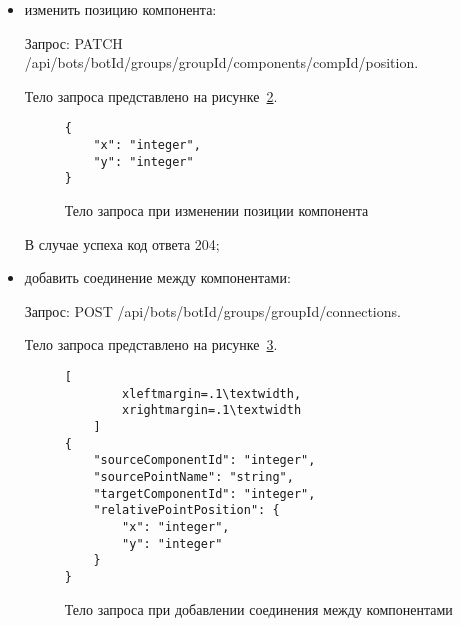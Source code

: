 \begin{itemize}
	      Тело запроса представлено на рисунке~\ref{f:update-component-data}.


	      \begin{figure}[!ht]
		      \centering
		      \vspace{\toppaddingoffigure}
		      \begin{lstlisting}
{
    "<property name>": "any",
    ...
}
    \end{lstlisting}
		      \caption{Тело запроса при изменении данных компонента}
		      \label{f:update-component-data}
	      \end{figure}

	      В случае успеха код ответа 204;

	\item изменить позицию компонента:

	      Запрос: PATCH /api/bots/{botId}/groups/{groupId}/components/{compId}/position.

	      Тело запроса представлено на рисунке~\ref{f:update-component-position}.


	      \begin{figure}[!ht]
		      \centering
		      \vspace{\toppaddingoffigure}
		      \begin{lstlisting}
{
    "x": "integer",
    "y": "integer"
}
    \end{lstlisting}
		      \caption{Тело запроса при изменении позиции компонента}
		      \label{f:update-component-position}
	      \end{figure}

	      В случае успеха код ответа 204;

	\item добавить соединение между компонентами:

	      Запрос: POST /api/bots/{botId}/groups/{groupId}/connections.

	      Тело запроса представлено на рисунке~\ref{f:add-connection}.

	      \begin{figure}[!ht]
		      \centering
		      \vspace{\toppaddingoffigure}
		      \begin{lstlisting}[
        xleftmargin=.1\textwidth,
        xrightmargin=.1\textwidth
    ]
{
    "sourceComponentId": "integer",
    "sourcePointName": "string",
    "targetComponentId": "integer",
    "relativePointPosition": {
        "x": "integer",
        "y": "integer"
    }
}
    \end{lstlisting}
		      \caption{Тело запроса при добавлении соединения между компонентами}
		      \label{f:add-connection}
	      \end{figure}


\end{itemize}
